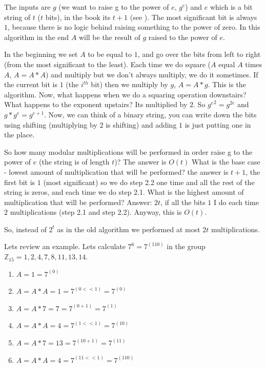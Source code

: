 The inputs are $g$ (we want to raise g to the power of $e$, \(g^e\)) and \(e\)
which is a bit string of $t$ ($t$ bits), in the book its $t+1$ (see
). The most significant bit is always $1$, because there is no
logic behind raising something to the power of zero. In this algorithm in the
end \(A\) will be the result of $g$ raised to the power of $e$. 

In the beginning we set $A$ to be equal to $1$, and go over the bits from left
to right (from the most significant to the least). Each time we do square ($A$
equal $A$ times $A$, $A=A*A$) and multiply but we don't always multiply, we do
it sometimes. If the current bit is $1$ (the \( i^{th}\) bit) then we multiply
by $g$, $A=A*g$. This is the algorithm. Now, what happens when we do a squaring
operation downstairs? What happens to the exponent upstairs? Its multiplied by
$2$. So \({g^{e}}^2 = g^{2e} \)  and  \(g*g^{e} = g^{e+1} \). Now, we can think
of a binary string, you can write down the bits using shifting (multiplying by
$2$ is shifting) and adding $1$ is just putting one in the place.

So how many modular multiplications will be performed in order raise g to the
power of $e$ (the string is of length $t$)? The answer is \(O(t)\) What is the
base case - lowest amount of multiplication that will be performed? the answer
is $t+1$, the first bit is $1$ (most significant) so we do step 2.2 one time and
all the rest of the string is zeros, and each time we do step 2.1. What is the
highest amount of multiplication that will be performed? Answer: $2t$, if all
the bits $1$ I do each time $2$ multiplications (step 2.1 and step 2.2). Anyway,
this is \(O(t)\).

So, instead of \(2^t\) as in the old algorithm we performed at most $2t$
multiplications. 

Lets review an example. Lets calculate \(7^6=7^{(110)}\) in the group \(
\mathbb{Z}_{15}={1, 2, 4 ,7, 8, 11, 13, 14} \).

\begin{enumerate}
	\item  \(A = 1 = 7^(0) \)
	\item  \(A = A*A = 1 = 7^{(0<<1)} = 7^{(0)}\)
	\item  \(A = A*7 = 7 = 7^{(0+1)} = 7^{(1)}\)
	\item  \(A = A*A = 4 = 7^{(1<<1)} = 7^{(10)} \)
	\item  \(A = A*7 = 13 = 7^{(10+1)} = 7^{(11)} \)
	\item  \( A = A*A = 4 = 7^{(11<<1)} = 7^{(110)} \)
\end{enumerate}

